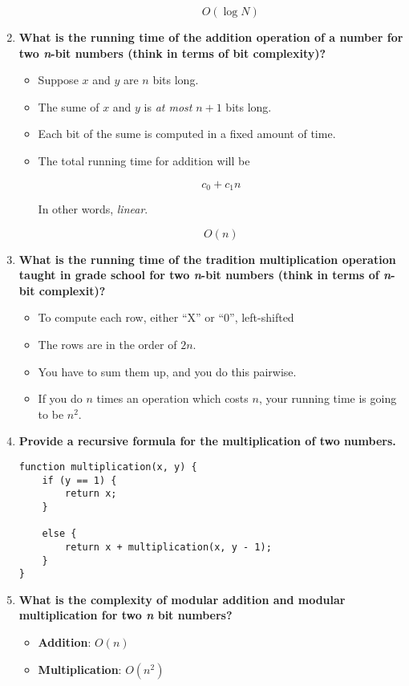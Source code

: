 \documentclass[a4paper,11pt]{article}
\begin{document}
\begin{enumerate}
\begin{itemize}
\begin{itemize}
      \[O(\log N)\]
    \end{itemize}
  \end{itemize}
\item
  \textbf{What is the running time of the addition operation of a number
  for two \emph{n}-bit numbers (think in terms of bit complexity)?}

  \begin{itemize}
  \item
    Suppose $x$ and $y$ are $n$ bits long.
  \item
    The sume of $x$ and $y$ is \emph{at most} $n + 1$ bits long.
  \item
    Each bit of the sume is computed in a fixed amount of time.
  \item
    The total running time for addition will be

    \[c_0 + c_1 n\]

    In other words, \emph{linear}.

    \[O(n)\]
  \end{itemize}
\item
  \textbf{What is the running time of the tradition multiplication
  operation taught in grade school for two \emph{n}-bit numbers (think
  in terms of \emph{n}-bit complexit)?}

  \begin{itemize}
  \itemsep1pt\parskip0pt
  \item
    To compute each row, either ``X'' or ``0'', left-shifted
  \item
    The rows are in the order of $2n$.
  \item
    You have to sum them up, and you do this pairwise.
  \item
    If you do $n$ times an operation which costs $n$, your running time
    is going to be $n^2$.
  \end{itemize}
\item
  \textbf{Provide a recursive formula for the multiplication of two
  numbers.}

\begin{verbatim}
function multiplication(x, y) {
    if (y == 1) {
        return x;
    }

    else {
        return x + multiplication(x, y - 1);
    }
}
\end{verbatim}
\item
  \textbf{What is the complexity of modular addition and modular
  multiplication for two \emph{n} bit numbers?}

  \begin{itemize}
  \itemsep1pt\parskip0pt
  \item
    \textbf{Addition}: $O(n)$
  \item
    \textbf{Multiplication}: $O(n^2)$
  \end{itemize}
\end{enumerate}
\end{document}

